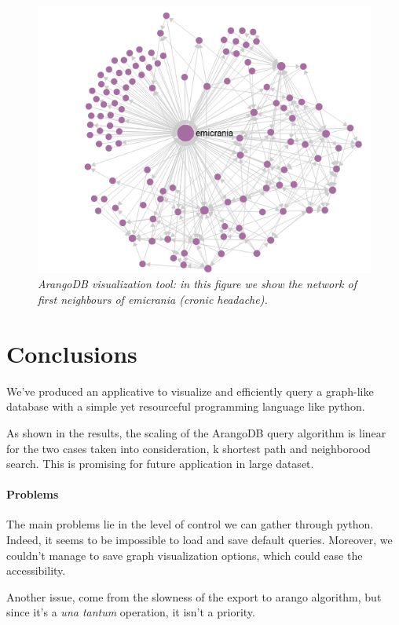 \documentclass[11pt,twocolumn]{article}
\begin{document}
\begin{figure}[ht]
   \includegraphics[width=\linewidth]{images/neigh_emicrania.png}
   \caption{\small{\textit{ArangoDB visualization tool: in this figure we show the network of first neighbours of \textit{emicrania} (cronic headache).}}}
   \label{fig:4}
\end{figure}

\section{Conclusions}

We've produced an applicative to visualize and efficiently query a graph-like database with a simple yet resourceful programming language like python.

As shown in the results, the scaling of the ArangoDB query algorithm is linear for the two cases taken into consideration, k shortest path and neighborood search. This is promising for future application in large dataset.

\paragraph{Problems}

The main problems lie in the level of control we can gather through python. Indeed, it seems to be impossible to load and save default queries.
Moreover, we couldn't manage to save graph visualization options, which could ease the accessibility.

Another issue, come from the slowness of the export to arango algorithm, but since it's a \textit{una tantum} operation, it isn't a priority. 
\end{document}
